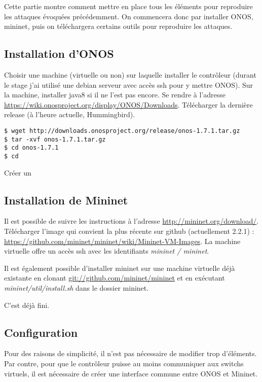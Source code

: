 Cette partie montre comment mettre en place tous les éléments pour reproduire les attaques évoquées précédemment. On commencera donc par installer ONOS, mininet, puis on téléchargera certains outils pour reproduire les attaques.

\subsection{Installation d'ONOS}

Choisir une machine (virtuelle ou non) sur laquelle installer le contrôleur (durant le stage j'ai utilisé une debian serveur avec accès ssh pour y mettre ONOS). Sur la machine, installer java8 si il ne l'est pas encore. Se rendre à l'adresse \url{https://wiki.onosproject.org/display/ONOS/Downloads}. Télécharger la dernière release (à l'heure actuelle, Hummingbird).

\begin{verbatim}
$ wget http://downloads.onosproject.org/release/onos-1.7.1.tar.gz
$ tar -xvf onos-1.7.1.tar.gz
$ cd onos-1.7.1
$ cd 
\end{verbatim}

Créer un

\subsection{Installation de Mininet}

Il est possible de suivre les instructions à l'adresse \url{http://mininet.org/download/}. Télécharger l'image qui convient la plus récente sur github (actuellement 2.2.1) : \url{https://github.com/mininet/mininet/wiki/Mininet-VM-Images}. La machine virtuelle offre un accès ssh avec les identifiants \textit{mininet / mininet}.

Il est également possible d'installer mininet sur une machine virtuelle déjà existante en clonant \url{git://github.com/mininet/mininet} et en exécutant \textit{mininet/util/install.sh} dans le dossier mininet.

C'est déjà fini.


\subsection{Configuration}

Pour des raisons de simplicité, il n'est pas nécessaire de modifier trop d'éléments. Par contre, pour que le contrôleur puisse au moins communiquer aux switchs virtuels, il est nécessaire de créer une interface commune entre ONOS et Mininet.

